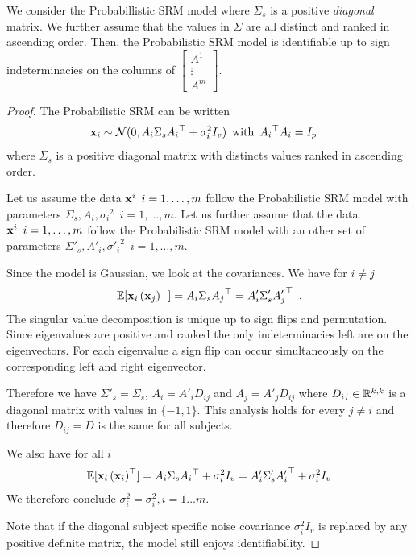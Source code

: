 \documentclass{article}
\begin{document}
\begin{proposition}
We consider the Probabillistic SRM model where $\Sigma_s$ is a positive \emph{diagonal} matrix. We further assume that the values in $\Sigma$ are all distinct and ranked in ascending order.
Then, the Probabilistic SRM model is identifiable up to sign indeterminacies on the columns of
$\begin{bmatrix}
A^1 \\
\vdots \\
A^m
\end{bmatrix}
$.
\end{proposition}
\begin{proof}
The Probabilistic SRM can be written
\begin{align*}
    &\mathbf{x}_i \sim \mathcal{N}(0, A_i \Sigma_s {A_i}^{\top} + \sigma_i^2 I_v) \enspace \text{with}\enspace  {A_i}^{\top}A_i = I_p
\end{align*}
where $\Sigma_s$ is a positive diagonal matrix with distincts values ranked in ascending order.

Let us assume the data $\mathbf{x}^i \enspace i=1, \dots, m$ follow the Probabilistic SRM model with parameters $\Sigma_s, A_i, {\sigma_i}^2 \enspace i=1, \dots, m$. Let us further assume that the data $\mathbf{x}^i \enspace i=1, \dots, m$ follow the Probabilistic SRM model with an other set of parameters $\Sigma'_s, A'_i, {\sigma'_i}^2 \enspace i=1, \dots, m$.

Since the model is Gaussian, we look at the covariances.
We have for $i \neq j$
\begin{align*}
    \mathbb{E}[\mathbf{x}_i\left(\mathbf{x}_j\right)^{\top}] = A_i\Sigma_s {A_j}^{\top} = A'_i \Sigma'_s{A'_j}^{\top} \enspace,
\end{align*}
The singular value decomposition is unique up to sign flips and permutation. Since eigenvalues are positive and ranked the only indeterminacies left are on the eigenvectors. For each eigenvalue a sign flip can occur simultaneously on the corresponding left and right eigenvector.

Therefore we have $\Sigma'_s = \Sigma_s$, $A_i = A'_i D_{ij}$ and $A_j = A'_j D_{ij}$ where $D_{ij} \in \mathbb{R}^{k, k}$ is a diagonal matrix with values in $\{-1, 1\}$. This analysis holds for every $j \neq i$ and therefore $D_{ij} = D$ is the same for all subjects.

We also have for all $i$
\begin{align*}
    \mathbb{E}[\mathbf{x}_i \left(\mathbf{x}_i\right)^{\top}] = A_i \Sigma_s {A_i}^{\top} + \sigma_i^2 I_v =  A'_i \Sigma'_s {A'_i}^{\top}  + {\sigma}_i^2 I_v\\
\end{align*}
We therefore conclude ${\sigma}_i^2 = \sigma_i^2, i=1 \dots m$.

Note that if the diagonal subject specific noise covariance $\sigma_i^2 I_v$ is replaced by any positive definite matrix, the model still enjoys identifiability.
\end{proof}
\end{document}

